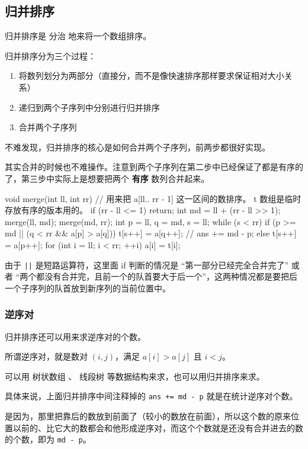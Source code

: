 \subsection{归并排序}

归并排序是  分治  地来将一个数组排序。

归并排序分为三个过程：

\begin{enumerate}
\item 将数列划分为两部分（直接分，而不是像快速排序那样要求保证相对大小关系）
\item 递归到两个子序列中分别进行归并排序
\item 合并两个子序列
\end{enumerate}

不难发现，归并排序的核心是如何合并两个子序列，前两步都很好实现。

其实合并的时候也不难操作。注意到两个子序列在第二步中已经保证了都是有序的了，第三步中实际上是想要把两个 \textbf{有序} 数列合并起来。

\begin{cppcode}
void merge(int ll, int rr) {
  // 用来把 a[ll.. rr - 1] 这一区间的数排序。 t 数组是临时存放有序的版本用的。
  if (rr - ll <= 1) return;
  int md = ll + (rr - ll >> 1);
  merge(ll, md);
  merge(md, rr);
  int p = ll, q = md, s = ll;
  while (s < rr) {
    if (p >= md || (q < rr && a[p] > a[q])) {
      t[s++] = a[q++];
      // ans += md - p;
    } else
      t[s++] = a[p++];
  }
  for (int i = ll; i < rr; ++i) a[i] = t[i];
}
\end{cppcode}

由于 \texttt{||} 是短路运算符，这里面 if 判断的情况是 “第一部分已经完全合并完了” 或者 “两个都没有合并完，且前一个的队首要大于后一个”，这两种情况都是要把后一个子序列的队首放到新序列的当前位置中。

\subsubsection{逆序对}

归并排序还可以用来求逆序对的个数。

所谓逆序对，就是数对 $(i, j)$，满足 $a[i] > a[j]$ 且 $i < j$。

可以用  树状数组 、 线段树  等数据结构来求，也可以用归并排序来求。

具体来说，上面归并排序中间注释掉的 \texttt{ans += md - p} 就是在统计逆序对个数。

是因为，那里把靠后的数放到前面了（较小的数放在前面），所以这个数的原来位置以前的、比它大的数都会和他形成逆序对，而这个个数就是还没有合并进去的数的个数，即为 \texttt{md - p}。

